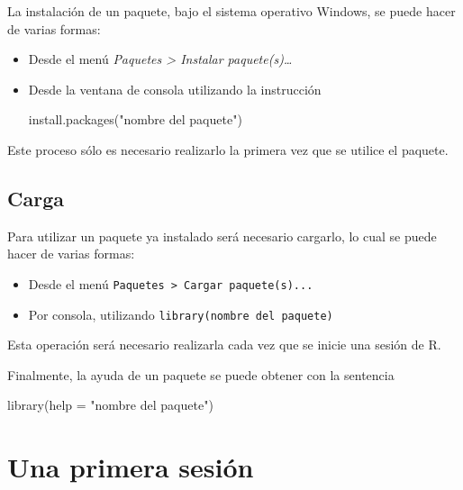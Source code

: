 \documentclass[
]{book}
\newenvironment{Shaded}{\begin{snugshade}}{\end{snugshade}}
\newcommand{\AttributeTok}[1]{\textcolor[rgb]{0.77,0.63,0.00}{#1}}
\newcommand{\FunctionTok}[1]{\textcolor[rgb]{0.00,0.00,0.00}{#1}}
\newcommand{\NormalTok}[1]{#1}
\newcommand{\StringTok}[1]{\textcolor[rgb]{0.31,0.60,0.02}{#1}}
\theoremstyle{break}
\begin{document}
La instalación de un paquete, bajo el sistema
operativo Windows, se puede hacer de varias formas:

\begin{itemize}
\item
  Desde el menú \emph{Paquetes \textgreater{} Instalar paquete(s)\ldots{}}
\item
  Desde la ventana de consola utilizando la instrucción

\begin{Shaded}
\begin{Highlighting}[]
\FunctionTok{install.packages}\NormalTok{(}\StringTok{"nombre del paquete"}\NormalTok{)}
\end{Highlighting}
\end{Shaded}
\end{itemize}

Este proceso sólo es necesario realizarlo la primera vez que se utilice
el paquete.

\hypertarget{carga}{%
\subsection{Carga}\label{carga}}

Para utilizar un paquete ya instalado será necesario cargarlo, lo cual se puede hacer de
varias formas:

\begin{itemize}
\item
  Desde el menú \texttt{Paquetes\ \textgreater{}\ Cargar\ paquete(s)...}
\item
  Por consola, utilizando \texttt{library(nombre\ del\ paquete)}
\end{itemize}

Esta operación será necesario realizarla cada vez que se inicie una
sesión de R.

Finalmente, la ayuda de un paquete se puede obtener con la sentencia

\begin{Shaded}
\begin{Highlighting}[]
\FunctionTok{library}\NormalTok{(}\AttributeTok{help =} \StringTok{"nombre del paquete"}\NormalTok{) }
\end{Highlighting}
\end{Shaded}

\hypertarget{una-primera-sesiuxf3n}{%
\section{Una primera sesión}\label{una-primera-sesiuxf3n}}
\end{document}
